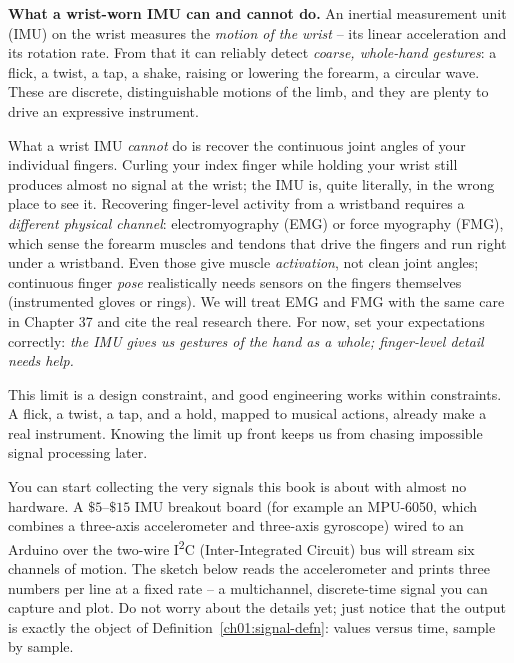 \begin{goalbox}
\textbf{What a wrist-worn IMU can and cannot do.} An inertial measurement unit (IMU) on the
wrist measures the \emph{motion of the wrist} -- its linear acceleration and its rotation rate.
From that it can reliably detect \emph{coarse, whole-hand gestures}: a flick, a twist, a tap, a
shake, raising or lowering the forearm, a circular wave. These are discrete, distinguishable
motions of the limb, and they are plenty to drive an expressive instrument.

What a wrist IMU \emph{cannot} do is recover the continuous joint angles of your individual
fingers. Curling your index finger while holding your wrist still produces almost no signal at
the wrist; the IMU is, quite literally, in the wrong place to see it. Recovering finger-level
activity from a wristband requires a \emph{different physical channel}: electromyography (EMG) or
force myography (FMG), which sense the forearm muscles and tendons that drive the fingers and run
right under a wristband. Even those give muscle \emph{activation}, not clean joint angles;
continuous finger \emph{pose} realistically needs sensors on the fingers themselves (instrumented
gloves or rings). We will treat EMG and FMG with the same care in Chapter 37 and cite the real
research there. For now, set your expectations correctly: \emph{the IMU gives us gestures of the
hand as a whole; finger-level detail needs help.}
\end{goalbox}

This limit is a design constraint, and good engineering works within
constraints. A flick, a twist, a tap, and a hold, mapped to musical actions, already make a real
instrument. Knowing the limit up front keeps us from chasing impossible signal processing later.

\begin{buildbox}
You can start collecting the very signals this book is about with almost no hardware. A
$\$5$--$\$15$ IMU breakout board (for example an MPU-6050, which combines a three-axis
accelerometer and three-axis gyroscope) wired to an Arduino over the two-wire I\textsuperscript{2}C (Inter-Integrated Circuit) bus will
stream six channels of motion. The sketch below reads the accelerometer and prints three numbers
per line at a fixed rate -- a multichannel, discrete-time signal you can capture and plot. Do not
worry about the details yet; just notice that the output is exactly the object of
Definition~\ref{ch01:signal-defn}: values versus time, sample by sample.
\end{buildbox}

